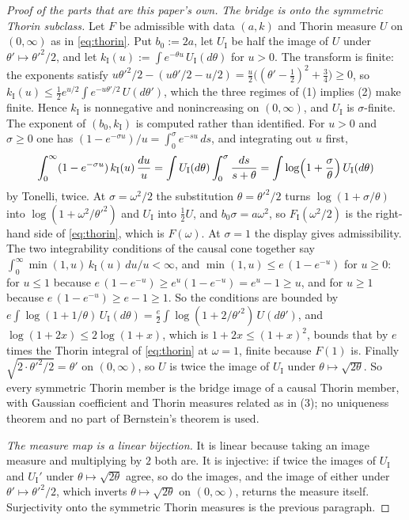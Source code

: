 \begin{proof}[Proof of the parts that are this paper's own]
\emph{The bridge is onto the symmetric Thorin subclass.} Let $F$ be admissible with data $(a,k)$
and Thorin measure $U$ on $(0,\infty)$ as in \ref{eq:thorin}. Put $b_0 := 2a$, let
$U_{\mathrm I}$ be half the image of $U$ under $\theta' \mapsto \theta'^2/2$, and let
$k_{\mathrm I}(u) := \int e^{-\theta u}\,U_{\mathrm I}(d\theta)$ for $u > 0$. The transform is
finite: the exponents satisfy
$u\theta'^2/2 - (u\theta'/2 - u/2) = \tfrac u2\bigl((\theta' - \tfrac12)^2 + \tfrac34\bigr) \ge 0$,
so $k_{\mathrm I}(u) \le \tfrac12 e^{u/2}\int e^{-u\theta'/2}\,U(d\theta')$, which the three
regimes of (1) implies (2) make finite. Hence $k_{\mathrm I}$ is nonnegative and nonincreasing on
$(0,\infty)$, and $U_{\mathrm I}$ is $\sigma$-finite. The exponent of $(b_0, k_{\mathrm I})$ is
computed rather than identified. For $u > 0$ and $\sigma \ge 0$ one has
$(1 - e^{-\sigma u})/u = \int_0^\sigma e^{-su}\,ds$, and integrating out $u$ first,
\[
  \int_0^\infty (1 - e^{-\sigma u})\,k_{\mathrm I}(u)\,\frac{du}{u}
  = \int U_{\mathrm I}(d\theta)\int_0^\sigma \frac{ds}{s + \theta}
  = \int \log\Bigl(1 + \frac{\sigma}{\theta}\Bigr)\,U_{\mathrm I}(d\theta)
\]
by Tonelli, twice. At $\sigma = \omega^2/2$ the substitution $\theta = \theta'^2/2$ turns
$\log(1 + \sigma/\theta)$ into $\log(1 + \omega^2/\theta'^2)$ and $U_{\mathrm I}$ into
$\tfrac12 U$, and $b_0\sigma = a\omega^2$, so $F_{\mathrm I}(\omega^2/2)$ is the right-hand side
of \ref{eq:thorin}, which is $F(\omega)$. At $\sigma = 1$ the display gives admissibility. The two
integrability conditions of the causal cone together say
$\int_0^\infty \min(1,u)\,k_{\mathrm I}(u)\,du/u < \infty$, and $\min(1,u) \le e\,(1 - e^{-u})$
for $u \ge 0$: for $u \le 1$ because $e\,(1 - e^{-u}) \ge e^u(1 - e^{-u}) = e^u - 1 \ge u$, and
for $u \ge 1$ because $e\,(1 - e^{-u}) \ge e - 1 \ge 1$. So the conditions are bounded by
$e\int \log(1 + 1/\theta)\,U_{\mathrm I}(d\theta)
= \tfrac e2\int \log(1 + 2/\theta'^2)\,U(d\theta')$, and $\log(1 + 2x) \le 2\log(1 + x)$, which
is $1 + 2x \le (1 + x)^2$, bounds that by $e$ times the Thorin integral of \ref{eq:thorin} at
$\omega = 1$, finite because $F(1)$ is. Finally $\sqrt{2\cdot\theta'^2/2} = \theta'$ on
$(0,\infty)$, so $U$ is twice the image of $U_{\mathrm I}$ under $\theta \mapsto \sqrt{2\theta}$.
So every symmetric Thorin member is the bridge image of a causal Thorin member, with Gaussian
coefficient and Thorin measures related as in (3); no uniqueness theorem and no part of
Bernstein's theorem is used.

\emph{The measure map is a linear bijection.} It is linear because taking an image measure and
multiplying by $2$ both are. It is injective: if twice the images of $U_{\mathrm I}$ and
$U_{\mathrm I}'$ under $\theta \mapsto \sqrt{2\theta}$ agree, so do the images, and the image of
either under $\theta' \mapsto \theta'^2/2$, which inverts $\theta \mapsto \sqrt{2\theta}$ on
$(0,\infty)$, returns the measure itself. Surjectivity onto the symmetric Thorin measures is the
previous paragraph.


\end{proof}
